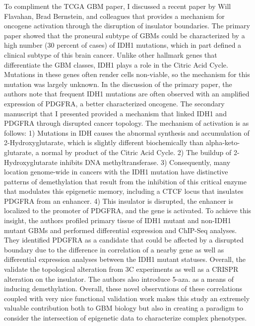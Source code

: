 \documentclass[12pt]{article}
\begin{document}
\begin{addmargin}[6.5mm]{4mm}  
To compliment the TCGA GBM paper, I discussed a recent paper by Will Flavahan, Brad Bernstein, and colleagues that provides a mechanism for oncogene activation through the disruption of insulator boundaries. The primary paper showed that the proneural subtype of GBMs could be characterized by a high number (30 percent of cases) of IDH1 mutations, which in part defined a clinical subtype of this brain cancer. Unlike other hallmark genes that differentiate the GBM classes, IDH1 plays a role in the Citric Acid Cycle. Mutations in these genes often render cells non-viable, so the mechanism for this mutation was largely unknown. In the discussion of the primary paper, the authors note that frequent IDH1 mutations are often observed with an amplified expression of PDGFRA, a better characterized oncogene. The secondary manuscript that I presented provided a mechanism that linked IDH1 and PDGFRA through disrupted cancer topology.  \newline \newline The mechanism of activation is as follows: 1) Mutations in IDH causes the abnormal synthesis and accumulation of 2-Hydroxyglutarate, which is slightly different biochemically than alpha-keto-glutarate, a normal by product of the Citric Acid Cycle. 2) The buildup of 2-Hydroxyglutarate inhibits DNA methyltransferase. 3) Consequently, many location genome-wide in cancers with the IDH1 mutation have distinctive patterns of demethylation that result from the inhibition of this critical enzyme that modulates this epigenetic memory, including a CTCF locus that insulates PDGFRA from an enhancer. 4) This insulator is disrupted, the enhancer is localized to the promoter of PDGFRA, and the gene is activated. \newline \newline To achieve this insight, the authors profiled primary tissue of IDH1 mutant and non-IDH1 mutant GBMs and performed differential expression and ChIP-Seq analyses. They identified PDGFRA as a candidate that could be affected by a disrupted boundary due to the difference in correlation of a nearby gene as well as differential expression analyses between the IDH1 mutant statuses. Overall, the validate the topological alteration from 3C experiments as well as a CRISPR alteration on the insulator. The authors also introduce 5-aza. as a means of inducing demethylation. Overall, these novel observations of these correlations coupled with very nice functional validation work makes this study an extremely valuable contribution both to GBM biology but also in creating a paradigm to consider the intersection of epigenetic data to characterize complex phenotypes.  \newline \newline 

\end{addmargin}
\end{document}
